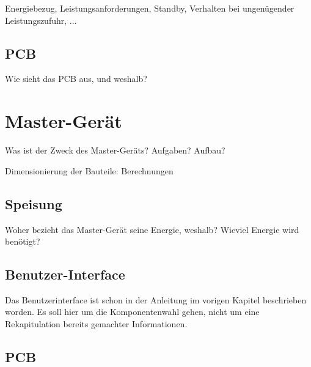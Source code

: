 Energiebezug,  Leistungsanforderungen, Standby,  Verhalten bei  ungen\"ugender
Leistungszufuhr, ...


\subsection{PCB}
\label{subsec:sensor:pcb}

Wie sieht das PCB aus, und weshalb?

\section{Master-Ger\"at}
\label{sec:hw:mastergerat}

Was ist der Zweck des Master-Ger\"ats? Aufgaben? Aufbau?

\anweisung Dimensionierung der Bauteile: Berechnungen


\subsection{Speisung}
\label{subsec:mastergerat:speisung}

Woher bezieht das Master-Ger\"at  seine Energie, weshalb? Wieviel Energie wird
ben\"otigt?


\subsection{Benutzer-Interface}
\label{subsec:mastergerat:interface}

\anweisung Das Benutzerinterface ist schon in der Anleitung im vorigen Kapitel
beschrieben worden. Es soll  hier um die Komponentenwahl gehen,  nicht um eine
Rekapitulation bereits gemachter Informationen.

\subsection{PCB}
\label{subsec:mastergerat:pcb}

